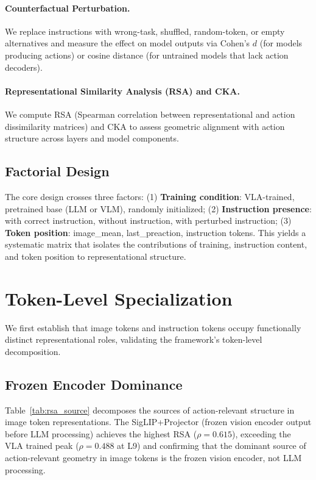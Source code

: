 \documentclass[10pt,letterpaper]{article}
\begin{document}
\paragraph{Counterfactual Perturbation.}
We replace instructions with wrong-task, shuffled, random-token, or empty alternatives and measure the effect on model outputs via Cohen's $d$ (for models producing actions) or cosine distance (for untrained models that lack action decoders).

\paragraph{Representational Similarity Analysis (RSA) and CKA.}
We compute RSA (Spearman correlation between representational and action dissimilarity matrices) and CKA to assess geometric alignment with action structure across layers and model components.

\subsection{Factorial Design}

The core design crosses three factors:
(1) \textbf{Training condition}: VLA-trained, pretrained base (LLM or VLM), randomly initialized;
(2) \textbf{Instruction presence}: with correct instruction, without instruction, with perturbed instruction;
(3) \textbf{Token position}: image\_mean, last\_preaction, instruction tokens.
This yields a systematic matrix that isolates the contributions of training, instruction content, and token position to representational structure.

\section{Token-Level Specialization}
\label{sec:c1}

We first establish that image tokens and instruction tokens occupy functionally distinct representational roles, validating the framework's token-level decomposition.

\subsection{Frozen Encoder Dominance}

Table~\ref{tab:rsa_source} decomposes the sources of action-relevant structure in image token representations.
The SigLIP+Projector (frozen vision encoder output before LLM processing) achieves the highest RSA ($\rho = 0.615$), exceeding the VLA trained peak ($\rho = 0.488$ at L9) and confirming that the dominant source of action-relevant geometry in image tokens is the frozen vision encoder, not LLM processing.
\end{document}
